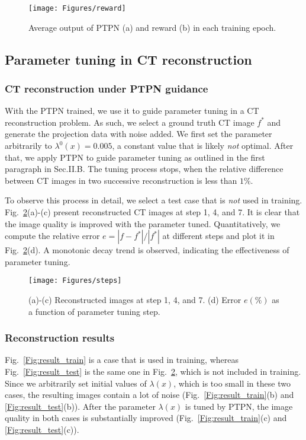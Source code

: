 \documentclass[journal]{IEEEtran}
\begin{document}
\begin{figure}[b]
	\centering
  \texttt{[image: Figures/reward]}
  	\caption{Average output of PTPN (a) and reward (b) in each training epoch. }
  \label{Fig:training}
\end{figure}

\subsection{Parameter tuning in CT reconstruction}

\subsubsection{CT reconstruction under PTPN guidance}
With the PTPN trained, we use it to guide parameter tuning in a CT reconstruction problem. As such, we select a ground truth CT image $f^*$ and generate the projection data with noise added. We first set the parameter arbitrarily to $\lambda^0(x)=0.005$, a constant value that is likely \emph{not} optimal. After that, we apply PTPN to guide parameter tuning as outlined in the first paragraph in Sec.II.B. The tuning process stops, when the relative difference between CT images in two successive reconstruction is less than $1\%$.

To observe this process in detail, we select a test case that is \emph{not} used in training. Fig.~\ref{Fig:steps}(a)-(c) present reconstructed CT images at step 1, 4, and 7. It is clear that the image quality is improved with the parameter tuned. Quantitatively, we compute the relative error $e=|f-f^*|/|f^*|$ at different steps and plot it in Fig.~\ref{Fig:steps}(d). A monotonic decay trend is observed, indicating the effectiveness of parameter tuning.

\begin{figure}
	\centering
  \texttt{[image: Figures/steps]}
  	\caption{(a)-(c) Reconstructed images at step 1, 4, and 7. (d) Error $e (\%)$ as a function of parameter tuning step. }
  \label{Fig:steps}
\end{figure}


\subsubsection{Reconstruction results}
Fig.~\ref{Fig:result_train}  is a case that is used in training, whereas Fig.~\ref{Fig:result_test} is the same one in Fig.~\ref{Fig:steps}, which is not included in training. Since we arbitrarily set initial values of $\lambda(x)$, which is too small in these two cases, the resulting images contain a lot of noise (Fig.~\ref{Fig:result_train}(b) and \ref{Fig:result_test}(b)). After the parameter $\lambda(x)$ is tuned by PTPN, the image quality in both cases is substantially improved (Fig.~\ref{Fig:result_train}(c) and \ref{Fig:result_test}(c)). 
\end{document}
